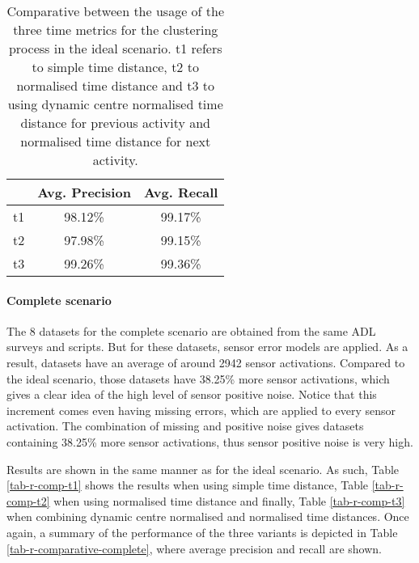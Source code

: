 \begin{table}[htbp]\scriptsize
\begin{center}
 \begin{tabular}{ccc}
  \hline
   & Avg. Precision & Avg. Recall \\
  \hline
  t1 & 98.12\% & 99.17\% \\
  t2 & 97.98\% & 99.15\% \\
  t3 & 99.26\% & 99.36\% \\
  \hline
 \end{tabular}
 \caption{Comparative between the usage of the three time metrics for the clustering process in the ideal scenario. t1 refers to simple time distance, t2 to normalised time distance and t3 to using dynamic centre normalised time distance for previous activity and normalised time distance for next activity.}
 \label{tab-r-comparative-ideal}
\end{center} 
\end{table}

\paragraph*{Complete scenario}

The 8 datasets for the complete scenario are obtained from the same ADL surveys and scripts. But for these datasets, sensor error models are applied. As a result, datasets have an average of around 2942 sensor activations. Compared to the ideal scenario, those datasets have 38.25\% more sensor activations, which gives a clear idea of the high level of sensor positive noise. Notice that this increment comes even having missing errors, which are applied to every sensor activation. The combination of missing and positive noise gives datasets containing 38.25\% more sensor activations, thus sensor positive noise is very high. 

Results are shown in the same manner as for the ideal scenario. As such, Table \ref{tab-r-comp-t1} shows the results when using simple time distance, Table \ref{tab-r-comp-t2} when using normalised time distance and finally, Table \ref{tab-r-comp-t3} when combining dynamic centre normalised and normalised time distances. Once again, a summary of the performance of the three variants is depicted in Table \ref{tab-r-comparative-complete}, where average precision and recall are shown.
       
